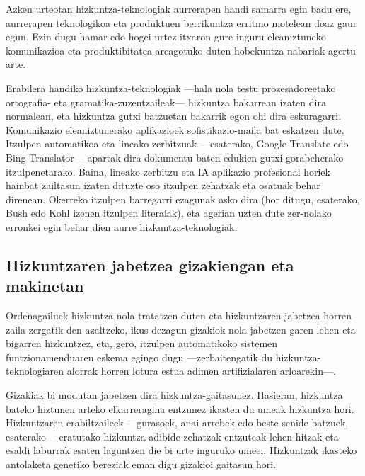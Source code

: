 \begin{multicols}{2}
   Azken urteotan hizkuntza-teknologiak aurrerapen handi samarra egin badu ere, aurrerapen teknologikoa eta produktuen berrikuntza erritmo motelean doaz gaur egun. Ezin dugu hamar edo hogei urtez itxaron gure inguru eleaniztuneko komunikazioa eta produktibitatea areagotuko duten hobekuntza nabariak agertu arte.


Erabilera handiko hizkuntza-teknologiak —hala nola testu prozesadoreetako ortografia- eta gramatika-zuzentzaileak— hizkuntza bakarrean izaten dira normalean, eta hizkuntza gutxi batzuetan bakarrik egon ohi dira eskuragarri. Komunikazio eleaniztunerako aplikazioek sofistikazio-maila bat eskatzen dute.  Itzulpen automatikoa eta lineako zerbitzuak —esaterako, Google Translate edo Bing Translator— apartak dira dokumentu baten edukien gutxi gorabeherako itzulpenetarako. Baina, lineako zerbitzu eta IA aplikazio profesional horiek hainbat zailtasun izaten dituzte oso itzulpen zehatzak eta osatuak behar direnean. Okerreko itzulpen barregarri ezagunak asko dira (hor ditugu, esaterako, Bush edo Kohl izenen itzulpen literalak), eta agerian uzten dute zer-nolako erronkei egin behar dien aurre hizkuntza-teknologiak.


\subsection{Hizkuntzaren jabetzea gizakiengan eta makinetan}

   Ordenagailuek hizkuntza nola tratatzen duten eta hizkuntzaren jabetzea horren zaila zergatik den azaltzeko, ikus dezagun gizakiok nola jabetzen garen lehen eta bigarren hizkuntzez, eta, gero, itzulpen automatikoko sistemen funtzionamenduaren eskema egingo dugu —zerbaitengatik du hizkuntza-teknologiaren alorrak horren lotura estua adimen artifizialaren arloarekin—.

Gizakiak bi modutan jabetzen dira hizkuntza-gaitasunez. Hasieran, hizkuntza bateko hiztunen arteko elkarreragina entzunez ikasten du umeak hizkuntza hori. Hizkuntzaren erabiltzaileek —gurasoek, anai-arrebek edo beste senide batzuek, esaterako— eratutako hizkuntza-adibide zehatzak entzuteak lehen hitzak eta esaldi laburrak esaten laguntzen die bi urte inguruko umeei. Hizkuntzak ikasteko antolaketa genetiko bereziak eman digu gizakioi gaitasun hori. 


\end{multicols}
